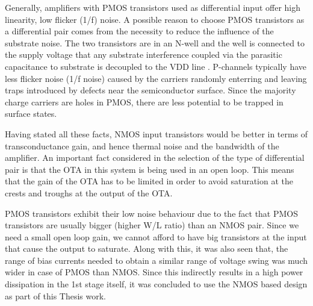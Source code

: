Generally, amplifiers with PMOS transistors used as differential input offer high linearity, low flicker (1/f) noise. A possible reason to choose PMOS transistors as a differential pair comes from the necessity to reduce the influence of the substrate noise. The two transistors are in an N-well and the well is connected to the supply voltage that any substrate interference coupled via the parasitic capacitance to substrate is decoupled to the VDD line \cite{ota_hf}. P-channels typically have less flicker noise (1/f noise) caused by the carriers randomly enterring and leaving traps introduced by defects near the semiconductor surface. Since the majority charge carriers are holes in PMOS, there are less potential to be trapped in surface states.

Having stated all these facts, NMOS input transistors would be better in terms of transconductance gain, and hence thermal noise and the bandwidth of the amplifier. An important fact considered in the selection of the type of differential pair is that the OTA in this system is being used in an open loop. This means that the gain of the OTA has to be limited in order to avoid saturation at the crests and troughs at the output of the OTA.

PMOS transistors exhibit their low noise behaviour due to the fact that PMOS transistors are usually bigger (higher W/L ratio) than an NMOS pair. Since we need a small open loop gain, we cannot afford to have big transistors at the input that cause the output to saturate. Along with this, it was also seen that, the range of bias currents needed to obtain a similar range of voltage swing was much wider in case of PMOS than NMOS. Since this indirectly results in a high power dissipation in the 1st stage itself, it was concluded to use the NMOS based design as part of this Thesis work.
\vfill
\clearpage


